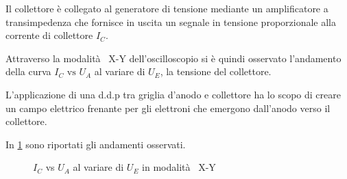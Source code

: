 Il collettore è collegato al generatore di tensione mediante un amplificatore a transimpedenza
	che fornisce in uscita un segnale in tensione proporzionale alla corrente di collettore $I_C$.

	Attraverso la modalità  X-Y dell'oscilloscopio si è quindi
	osservato l'andamento della curva $I_C \text{ vs } U_A$ al
	variare di $U_E$, la tensione del collettore.
	
	L'applicazione di una d.d.p tra griglia d'anodo e collettore ha lo scopo di creare un campo elettrico frenante per gli elettroni che emergono dall'anodo verso il collettore.
	
	In \figurename{ \ref{fig:ue}} sono riportati gli andamenti osservati.
	
\begin{figure}[h!]
		\centering
		\caption{$I_C$ vs $U_A$ al variare di $U_E$ in modalità  X-Y}
	\label{fig:ue}
\end{figure}
